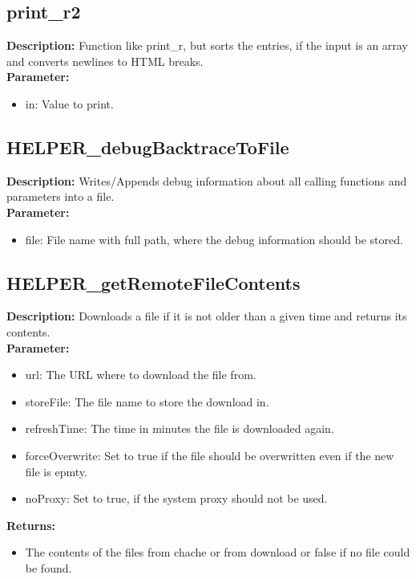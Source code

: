 \subsection{print\_r2}
\textbf{Description:} Function like print\_r, but sorts the entries, if the input is an array and converts newlines to HTML breaks.\\
\textbf{Parameter:}
\begin{itemize}
\item in: Value to print.
\end{itemize}

\subsection{HELPER\_debugBacktraceToFile}
\textbf{Description:} Writes/Appends debug information about all calling functions and parameters into a file.\\
\textbf{Parameter:}
\begin{itemize}
\item file: File name with full path, where the debug information should be stored.
\end{itemize}

\subsection{HELPER\_getRemoteFileContents}
\textbf{Description:} Downloads a file if it is not older than a given time and returns its contents.\\
\textbf{Parameter:}
\begin{itemize}
\item url: The URL where to download the file from.
\item storeFile: The file name to store the download in.
\item refreshTime: The time in minutes the file is downloaded again.
\item forceOverwrite: Set to true if the file should be overwritten even if the new file is epmty.
\item noProxy: Set to true, if the system proxy should not be used.
\end{itemize}
\textbf{Returns:}
\begin{itemize}
\item The contents of the files from chache or from download or false if no file could be found.
\end{itemize}

